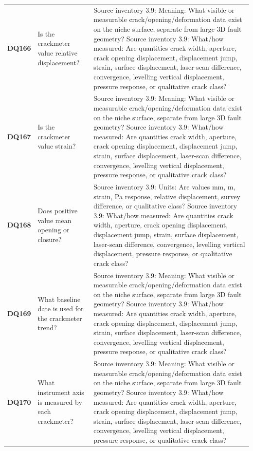 \begin{longtable}{@{}L{0.09\textwidth} L{0.31\textwidth} L{0.52\textwidth}@{}}
\addlinespace[0.18em]
\textbf{DQ166} & Is the crackmeter value relative displacement? & Source inventory 3.9: Meaning: What visible or measurable crack/opening/deformation data exist on the niche surface, separate from large 3D fault geometry? Source inventory 3.9: What/how measured: Are quantities crack width, aperture, crack opening displacement, displacement jump, strain, surface displacement, laser-scan difference, convergence, levelling vertical displacement, pressure response, or qualitative crack class?\\
\addlinespace[0.18em]
\textbf{DQ167} & Is the crackmeter value strain? & Source inventory 3.9: Meaning: What visible or measurable crack/opening/deformation data exist on the niche surface, separate from large 3D fault geometry? Source inventory 3.9: What/how measured: Are quantities crack width, aperture, crack opening displacement, displacement jump, strain, surface displacement, laser-scan difference, convergence, levelling vertical displacement, pressure response, or qualitative crack class?\\
\addlinespace[0.18em]
\textbf{DQ168} & Does positive value mean opening or closure? & Source inventory 3.9: Units: Are values mm, m, strain, Pa response, relative displacement, survey difference, or qualitative class? Source inventory 3.9: What/how measured: Are quantities crack width, aperture, crack opening displacement, displacement jump, strain, surface displacement, laser-scan difference, convergence, levelling vertical displacement, pressure response, or qualitative crack class?\\
\addlinespace[0.18em]
\textbf{DQ169} & What baseline date is used for the crackmeter trend? & Source inventory 3.9: Meaning: What visible or measurable crack/opening/deformation data exist on the niche surface, separate from large 3D fault geometry? Source inventory 3.9: What/how measured: Are quantities crack width, aperture, crack opening displacement, displacement jump, strain, surface displacement, laser-scan difference, convergence, levelling vertical displacement, pressure response, or qualitative crack class?\\
\addlinespace[0.18em]
\textbf{DQ170} & What instrument axis is measured by each crackmeter? & Source inventory 3.9: Meaning: What visible or measurable crack/opening/deformation data exist on the niche surface, separate from large 3D fault geometry? Source inventory 3.9: What/how measured: Are quantities crack width, aperture, crack opening displacement, displacement jump, strain, surface displacement, laser-scan difference, convergence, levelling vertical displacement, pressure response, or qualitative crack class?\\

\end{longtable}
